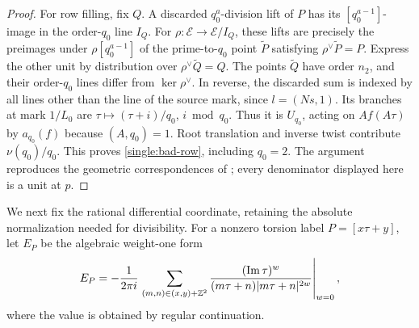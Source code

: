 \begin{proof}
For row filling, fix \(Q\).  A discarded \(q_0^a\)-division lift of
\(P\) has its \([q_0^{a-1}]\)-image in the order-\(q_0\) line \(I_Q\).
For \(\rho:\mathcal E\to\mathcal E/I_Q\), these lifts are precisely
the preimages under \(\rho[q_0^{a-1}]\) of the prime-to-\(q_0\) point
\(\widetilde P\) satisfying \(\rho^\vee\widetilde P=P\).
Express the other unit by distribution over
\(\rho^\vee\widetilde Q=Q\).  The points \(\widetilde Q\) have order
\(n_2\), and their order-\(q_0\) lines differ from \(\ker\rho^\vee\).
In reverse, the discarded sum is indexed by all lines other than the
line of the source mark, since \(l=(Ns,1)\).  Its branches at mark
\(1/L_0\) are \(\tau\mapsto(\tau+i)/q_0\), \(i\bmod q_0\).
Thus it is \(U_{q_0}\), acting on \(Af(A\tau)\) by \(a_{q_0}(f)\)
because \((A,q_0)=1\).  Root translation and inverse twist contribute
\(\nu(q_0)/q_0\).  This proves \eqref{single:bad-row}, including
\(q_0=2\).  The argument reproduces the geometric correspondences of
\cite[Section~4, ``Good-prime norms and rectangular filling'']{B};
every denominator displayed here is a unit at \(p\).
\end{proof}

We next fix the rational differential coordinate, retaining the absolute
normalization needed for divisibility.  For a nonzero torsion label
\(P=[x\tau+y]\), let \(E_P\) be the algebraic weight-one form
\[
 E_P=-\frac1{2\pi i}\left.
 \sum_{(m,n)\in(x,y)+\mathbb Z^2}
 \frac{(\operatorname{Im}\tau)^w}
 {(m\tau+n)|m\tau+n|^{2w}}\right|_{w=0},
\]
where the value is obtained by regular continuation.

